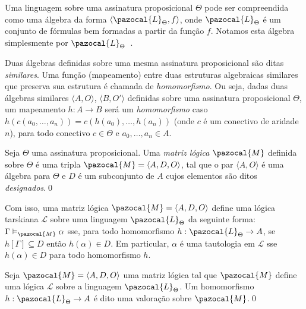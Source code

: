         \begin{observacao}
            Uma linguagem sobre uma assinatura proposicional $\Theta$ pode ser compreendida como uma álgebra da forma $\langle \pazocal{L}_{\Theta}, f \rangle$, onde $\pazocal{L}_{\Theta}$ é um conjunto de fórmulas bem formadas a partir da função $f$. Notamos esta álgebra simplesmente por $\pazocal{L}_{\Theta}$~\cite{Sikorski1966-SIKAOF}.
        \end{observacao}

        Duas álgebras definidas sobre uma mesma assinatura proposicional são ditas \textit{similares}. Uma função (mapeamento) entre duas estruturas algebraicas similares que preserva sua estrutura é chamada de \textit{homomorfismo}. Ou seja, dadas duas álgebras similares $\langle A, O \rangle$, $\langle B, O' \rangle$ definidas sobre uma assinatura proposicional $\Theta$, um mapeamento $h : A \rightarrow B$ será um \textit{homomorfismo} caso $h(c(a_{0},\ldots, a_{n})) = c(h(a_{0}),\ldots, h(a_{n}))$ (onde $c$ é um conectivo de aridade $n$), para todo conectivo $c \in \Theta$ e $a_{0},\ldots,a_{n} \in A$. 

        \begin{definicao}
            Seja $\Theta$ uma assinatura proposicional. Uma \textit{matriz lógica} $\pazocal{M}$ definida sobre $\Theta$ é uma tripla $\pazocal{M} = \langle A, D, O \rangle$, tal que o par $\langle A, O \rangle$ é uma álgebra para $\Theta$ e $D$ é um subconjunto de $A$ cujos elementos são ditos \textit{designados}.\qed{}
        \end{definicao}

        Com isso, uma matriz lógica $\pazocal{M} = \langle A, D, O \rangle$ define uma lógica tarskiana $\mathcal{L}$ sobre uma linguagem $\pazocal{L}_{\Theta}$ da seguinte forma: $\Gamma \vDash_{\pazocal{M}} \alpha$ sse, para todo homomorfismo $h : \pazocal{L}_{\Theta} \rightarrow A$, se $h[\Gamma] \subseteq D$ então $h(\alpha) \in D$. Em particular, $\alpha$ é uma tautologia em $\mathcal{L}$ sse $h(\alpha) \in D$ para todo homomorfismo $h$.

        \begin{definicao}[Valoração]
            Seja $\pazocal{M} = \langle A, D, O \rangle$ uma matriz lógica tal que $\pazocal{M}$ define uma lógica $\mathcal{L}$ sobre a linguagem $\pazocal{L}_{\Theta}$. Um homomorfismo $h : \pazocal{L}_{\Theta} \rightarrow A$ é dito uma valoração sobre $\pazocal{M}$.\qed{}
        \end{definicao}


